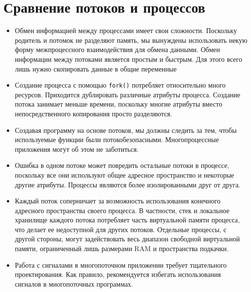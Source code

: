 \documentclass{beamer}
\begin{document}
\section{Сравнение потоков и процессов}

\begin{frame}{}
    \begin{itemize}
        \item Обмен информацией между процессами имеет свои сложности. Поскольку родитель и потомок не разделяют память, мы вынуждены использовать некую форму межпроцессного взаимодействия для обмена данными. Обмен информации между потоками является простым и быстрым. Для этого всего лишь нужно скопировать данные в общие переменные
        \item Создание процесса с помощью \texttt{fork()} потребляет относительно много ресурсов. Приходится дублировать различные атрибуты процесса. Создание потока занимает меньше времени, поскольку многие атрибуты вместо непосредственного копирования просто разделяются.
        \item Создавая программу на основе потоков, мы должны следить за тем, чтобы используемые функции были потокобезопасными. Многопроцессные приложения могут об этом не заботиться.
    \end{itemize}
\end{frame}

\begin{frame}{}
    \begin{itemize}
        \item Ошибка в одном потоке может повредить остальные потоки в процессе, поскольку все они используют общее адресное пространство и некоторые другие атрибуты. Процессы являются более изолированными друг от друга.
        \item Каждый поток соперничает за возможность использования конечного адресного пространства своего процесса. В частности, стек и локальное хранилище каждого потока потребляет часть виртуальной памяти процесса, что делает ее недоступной для других потоков. Отдельные процессы, с другой стороны, могут задействовать весь диапазон свободной виртуальной памяти, ограниченный лишь размерами RAM и пространства подкачки.
        \item Работа с сигналами в многопоточном приложении требует тщательного проектирования. Как правило, рекомендуется избегать использования сигналов в многопоточных программах.
    \end{itemize}
\end{frame}
\end{document}
